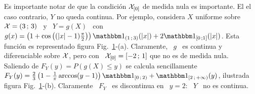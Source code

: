 Es  importante  notar  de  que  la  condici\'on $\mathcal{X}_{[0]}$  de  medida  nula  es
importante. El el caso contrario,  $Y$ no queda continua. Por ejemplo, considera
$X$ uniforme sobre  \ $\mathcal{X} = (  3 \, ; \,  3)$ \ y \ $Y  = g(X)$ \ con  \ $g(x) =
\left(  1 + \cos\left(  (|x|-1) \frac{\pi}{2}  \right) \right)  \un_{(1 \,  ; \,
  3)}(|x|) +  2 \un_{[0 \, ;  1]}(|x|)$.  Esta funci\'on  es representado figura
Fig.~\ref{fig:MP:TransformacionVANoContinua}-(a).    Claramente,  \  $g$   \  es
continua y diferenciable sobre $\mathcal{X}$, pero con \ $\mathcal{X}_{[0]} = [ -2 \, ; \, 1]$ que
no  es  de medida  nula.   Saliendo  de $F_Y(y)  =  P(g(X)  \le  y)$ se  calcula
sencillamente  $F_Y(y)  = \frac23  \left(  1  -  \frac1\pi \arccos(y-1)  \right)
\un_{[0  \,  ; \,  2)}  +  \un_{[ 2  \,  ;  \,  +\infty)}(y)$, ilustrada  figura
Fig.~\ref{fig:MP:TransformacionVANoContinua}-(b).   Claramente   \  $F_Y$  \  es
discontinua en \ $y = 2$: \ $Y$ \ no es continua.

\begin{figure}[h!]
\begin{center}  \end{center}
%
\label{fig:MP:TransformacionVANoContinua}
\end{figure}




\




